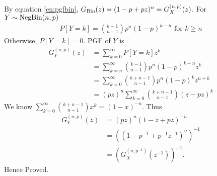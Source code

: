 \begin{solution}
	By equation \ref{en:pgfbin}, $G_{\text{Bin}}(z) = (1-p + pz)^n = G_X^{(n,p)}(z)$. For
	$Y\sim\text{NegBin}(n,p)$
	\begin{align}
	    P[Y=k] = \binom{k-1}{n-1}p^n(1-p)^{k-n}
	    \text{ for } k\geq n
	\end{align}
	Otherwise, $P[Y=k]=0$. PGF of $Y$ is
	\begin{align}
	    G_Y^{(n,p)}(z) &= \sum_{k=0}^\infty P[Y=k]z^k \\
				&= \sum_{k=n}^\infty \binom{k-1}{n-1}p^n(1-p)^{k-n}z^k \\
				&= \sum_{k=0}^\infty \binom{k+n-1}{n-1}p^n(1-p)^kz^{n+k} \\
				&= (pz)^n\sum_{k=0}^\infty \binom{k+n-1}{n-1}(z-pz)^k
	\end{align}
	We know $\sum_{k=0}^\infty \binom{k+n-1}{n-1}x^k = (1-x)^{-n}$. Thus
	\begin{align}
	    G_Y^{(n,p)}(z) &= (pz)^n(1-z+pz)^{-n} \\
			   &= \left((1-p^{-1} + p^{-1}z^{-1})^n\right)^{-1} \\
			   &= (G_X^{(n,p^{-1})}(z^{-1}))^{-1}.
	\end{align}
	Hence Proved.
\end{solution}
